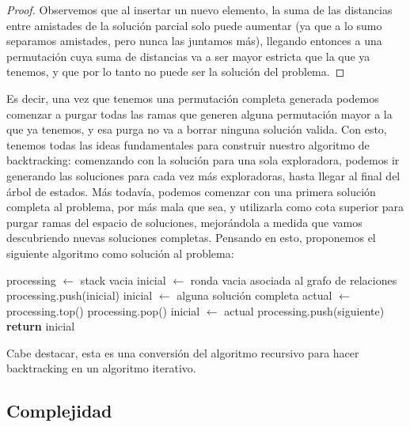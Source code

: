 \documentclass{article}
\theoremstyle{definition}
\theoremstyle{remark}
\begin{document}
\begin{proof}
Observemos que al insertar un nuevo elemento, la suma de las distancias entre amistades de la solución parcial solo puede aumentar (ya que a lo sumo separamos amistades, pero nunca las juntamos más), llegando entonces a una permutación cuya suma de distancias va a ser mayor estricta que la que ya tenemos, y que por lo tanto no puede ser la solución del problema.
\end{proof}

Es decir, una vez que tenemos una permutación completa generada podemos comenzar a purgar todas las ramas que generen alguna permutación mayor a la que ya tenemos, y esa purga no va a borrar ninguna solución valida. Con esto, tenemos todas las ideas fundamentales para construir nuestro algoritmo de backtracking: comenzando con la solución para una sola exploradora, podemos ir generando las soluciones para cada vez más exploradoras, hasta llegar al final del árbol de estados. Más todavía, podemos comenzar con una primera solución completa al problema, por más mala que sea, y utilizarla como cota superior para purgar ramas del espacio de soluciones, mejorándola a medida que vamos descubriendo nuevas soluciones completas. Pensando en esto, proponemos el siguiente algoritmo como solución al problema:

\begin{algorithmic}[1]
\State processing $\gets$ stack vacia 
\State inicial $\gets$ ronda vacia asociada al grafo de relaciones 
\State processing.push(inicial) 
\State inicial $\gets$ alguna solución completa 
 
\State actual $\gets$ processing.top() 
\State processing.pop() 
 
 
\State inicial $\gets$ actual 
\EndIf
\Else
{} 
 
\State processing.push(siguiente) 
\EndIf
\EndFor
\EndIf
\EndWhile
\State \textbf{return} inicial
\EndProcedure
\end{algorithmic}

Cabe destacar, esta es una conversión del algoritmo recursivo para hacer backtracking en un algoritmo iterativo.

\subsection{Complejidad}
\end{document}

